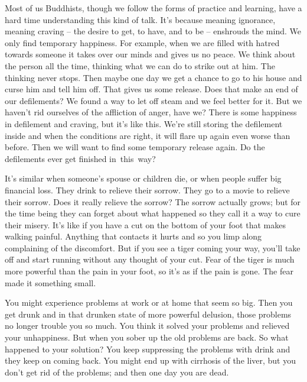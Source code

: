 Most of us Buddhists, though we follow the forms of practice and \mbox{learning,} have a hard time understanding this kind of talk. It's because  meaning ignorance, meaning craving -- the desire to get, to have, and to be -- enshrouds the mind. We only find temporary happiness. For example, when we are filled with hatred towards someone it takes over our minds and gives us no peace. We think about the person all the time, thinking what we can do to strike out at him. The thinking never stops. Then maybe one day we get a chance to go to his house and curse him and tell him off. That gives us some release. Does that make an end of our defilements? We found a way to let off steam and we feel better for it. But we haven't rid ourselves of the affliction of anger, have we? There is some happiness in defilement and craving, but it's like this. We're still storing the defilement inside and when the conditions are right, it will flare up again even worse than before. Then we will want to find some temporary release again. Do the defilements ever get finished \mbox{in this way?}

It's similar when someone's spouse or children die, or when people suffer big financial loss. They drink to relieve their sorrow. They go to a movie to relieve their sorrow. Does it really relieve the sorrow? The sorrow actually grows; but for the time being they can forget about what happened so they call it a way to cure their misery. It's like if you have a cut on the bottom of your foot that makes walking painful. Anything that contacts it hurts and so you limp along complaining of the discomfort. But if you see a tiger coming your way, you'll take off and start running without any thought of your cut. Fear of the tiger is much more powerful than the pain in your foot, so it's as if the pain is gone. The fear made it something small. 

You might experience problems at work or at home that seem so big. Then you get drunk and in that drunken state of more powerful delusion, those problems no longer trouble you so much. You think it solved your problems and relieved your unhappiness. But when you sober up the old problems are back. So what happened to your solution? You keep suppressing the problems with drink and they keep on coming back. You might end up with cirrhosis of the liver, but you don't get rid of the problems; and then one day you are dead. 

